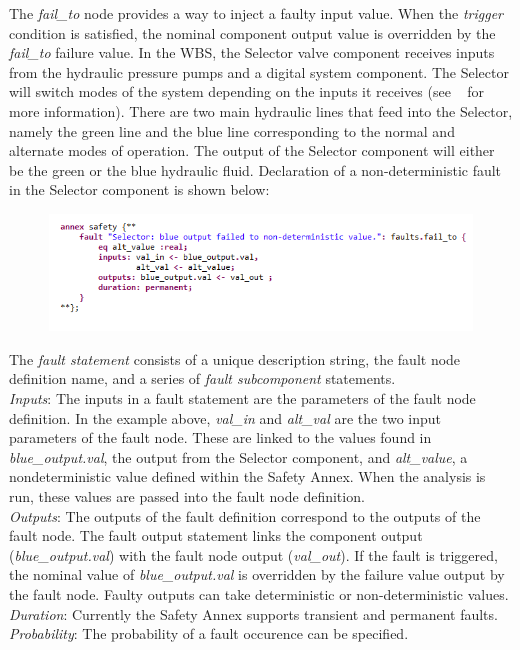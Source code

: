 The \textit{fail\_to} node provides a way to inject a faulty input value. When the \textit{trigger} condition is satisfied, the nominal component output value is overridden by the \textit{fail\_to} failure value. In the WBS, the Selector valve component receives inputs from the hydraulic pressure pumps and a digital system component. The Selector will switch modes of the system depending on the inputs it receives (see ~\cite{AIR6110,Stewart17:IMBSA} for more information). There are two main hydraulic lines that feed into the Selector, namely the green line and the blue line corresponding to the normal and alternate modes of operation. The output of the Selector component will either be the green or the blue hydraulic fluid. Declaration of a non-deterministic fault in the Selector component is shown below:
\begin{figure}[h!]
\vspace{-0.17in}
\begin{center}
\includegraphics[trim=0 15 0 11,clip,width=1.0\textwidth]{images/annex.png}
\end{center}
\vspace{-0.40in}
\end{figure}

The \textit{fault statement} consists of a unique description string, the fault node definition name, and a series of \textit{fault subcomponent} statements. \\
\textit{Inputs}: The inputs in a fault statement are the parameters of the fault node definition. In the example above, \textit{val\_in} and \textit{alt\_val} are the two input parameters of the fault node. These are linked to the values found in \textit{blue\_output.val}, the output from the Selector component, and \textit{alt\_value}, a nondeterministic value defined within the Safety Annex. When the analysis is run, these values are passed into the fault node definition.\\
\textit{Outputs}: The outputs of the fault definition correspond to the outputs of the fault node. The fault output statement links the component output (\textit{blue\_output.val}) with the fault node output (\textit{val\_out}). If the fault is triggered, the nominal value of \textit{blue\_output.val} is overridden by the failure value output by the fault node. Faulty outputs can take deterministic or non-deterministic values. \\
\textit{Duration}: Currently the Safety Annex supports transient and permanent faults.\\
\textit{Probability}: The probability of a fault occurence can be specified.






